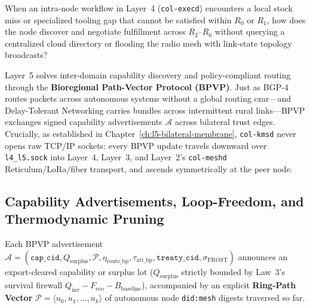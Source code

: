 When an intra-node workflow in Layer~4 (\texttt{col-execd}) encounters a local stock miss or
specialized tooling gap that cannot be satisfied within $R_0$ or $R_1$, how does the node discover
and negotiate fulfillment across $R_2\text{--}R_6$ without querying a centralized cloud directory
or flooding the radio mesh with link-state topology broadcasts?

Layer~5 solves inter-domain capability discovery and policy-compliant routing through the
\textbf{Bioregional Path-Vector Protocol (BPVP)}. Just as BGP-4 \parencite{rekhter2006} routes
packets across autonomous systems without a global routing czar---and Delay-Tolerant Networking
\parencite{fall2003} carries bundles across intermittent rural links---BPVP exchanges signed
capability advertisements $\mathcal{A}$ across bilateral trust edges. Crucially, as established in
Chapter~\ref{ch:l5-bilateral-membrane}, \texttt{col-kmsd} never opens raw TCP/IP sockets: every
BPVP update travels downward over \texttt{l4\_l5.sock} into Layer~4, Layer~3, and Layer~2's
\texttt{col-meshd} Reticulum/LoRa/fiber transport, and ascends symmetrically at the peer node.

\subsection{Capability Advertisements, Loop-Freedom, and Thermodynamic Pruning}

Each BPVP advertisement $\mathcal{A} = (\mathtt{cap\_cid}, Q_{\mathrm{surplus}}, \mathcal{P},
\eta_{\mathrm{route\_bp}}, \tau_{\mathrm{att\_bp}}, \mathtt{treaty\_cid}, \sigma_{\mathrm{FROST}})$
announces an export-cleared capability or surplus lot ($Q_{\mathrm{surplus}}$ strictly bounded by
Law~3's survival firewall $Q_{\mathrm{inv}} - F_{\mathrm{eco}} - B_{\mathrm{baseline}}$), accompanied
by an explicit \textbf{Ring-Path Vector} $\mathcal{P} = \langle u_0, u_1, \dots, u_k \rangle$ of
autonomous node \texttt{did:mesh} digests traversed so far.

